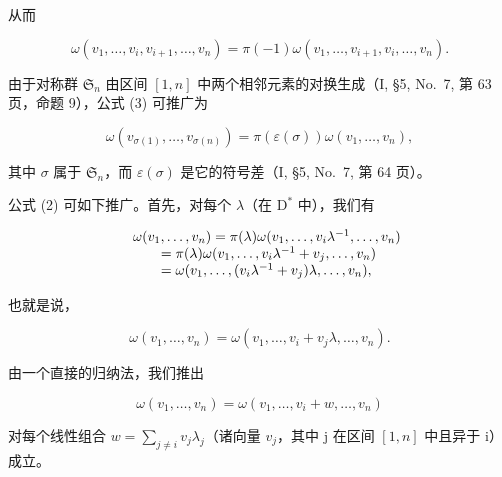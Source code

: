 从而

\[
\omega (v _ {1}, \dots , v _ {i}, v _ {i + 1}, \dots , v _ {n}) = \pi (- 1) \omega (v _ {1}, \dots , v _ {i + 1}, v _ {i}, \dots , v _ {n}).\tag{3}
\]

由于对称群 \(\mathfrak{S}_n\) 由区间 \([1,n]\) 中两个相邻元素的对换生成（I, §5, No.~7, 第 63 页，命题 9），公式 (3) 可推广为

\[
\omega (v _ {\sigma (1)}, \ldots , v _ {\sigma (n)}) = \pi (\varepsilon (\sigma)) \omega (v _ {1}, \ldots , v _ {n}),\tag{4}
\]

其中 \(\sigma\) 属于 \(\mathfrak{S}_n\)，而 \(\varepsilon (\sigma)\) 是它的符号差（I, §5, No.~7, 第 64 页）。

公式 (2) 可如下推广。首先，对每个 \(\lambda\)（在 \(\mathrm{D}^*\) 中），我们有

\[
\begin{array}{r l} & {\omega (v _ {1}, \ldots , v _ {n}) = \pi (\lambda) \omega (v _ {1}, \ldots , v _ {i} \lambda^ {- 1}, \ldots , v _ {n})} \\ & {\qquad = \pi (\lambda) \omega (v _ {1}, \ldots , v _ {i} \lambda^ {- 1} + v _ {j}, \ldots , v _ {n})} \\ & {\qquad = \omega (v _ {1}, \ldots , (v _ {i} \lambda^ {- 1} + v _ {j}) \lambda , \ldots , v _ {n}),} \end{array}
\]

也就是说，

\[
\omega (v _ {1}, \dots , v _ {n}) = \omega (v _ {1}, \dots , v _ {i} + v _ {j} \lambda , \dots , v _ {n}).\tag{5}
\]

由一个直接的归纳法，我们推出

\[
\omega (v _ {1}, \ldots , v _ {n}) = \omega (v _ {1}, \ldots , v _ {i} + w, \ldots , v _ {n})\tag{6}
\]

对每个线性组合 \(w = \sum_{j \neq i} v_j \lambda_j\)（诸向量 \(v_j\)，其中 j 在区间 \([1, n]\) 中且异于 i）成立。

